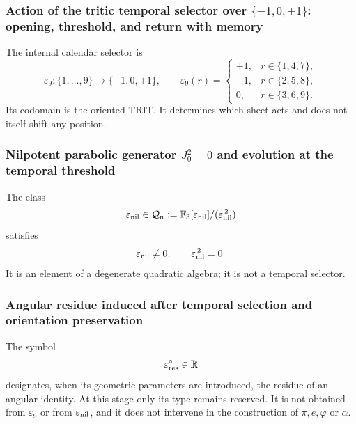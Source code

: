 {\subsubsection{Action of the tritic temporal selector over \(\{-1,0,+1\}\): opening, threshold, and return with memory}

The internal calendar selector is
\begin{equation}
 \varepsilon_9:\{1,\ldots,9\}
 \longrightarrow\{-1,0,+1\},
 \qquad
 \varepsilon_9(r)=
 \begin{cases}
  +1,&r\in\{1,4,7\},\\
  -1,&r\in\{2,5,8\},\\
  0,&r\in\{3,6,9\}.
 \end{cases}
 \label{p12-83-c1-s7:eq:u006e-epsilon-temporal}
\end{equation}
Its codomain is the oriented TRIT. It determines which sheet acts and does not itself shift any position.

\subsubsection{Nilpotent parabolic generator \(J_0^2=0\) and evolution at the temporal threshold}

The class
\begin{equation}
 \varepsilon_{\rm nil}
 \in
 \mathcal Q_{\rm n}:=
 \mathbb F_3[\varepsilon_{\rm nil}]
 /(\varepsilon_{\rm nil}^{\,2})
 \label{p12-83-c1-s7:eq:u006e-epsilon-nilpotente}
\end{equation}
satisfies
\begin{equation}
 \varepsilon_{\rm nil}\neq0,
 \qquad
 \varepsilon_{\rm nil}^{\,2}=0.
 \label{p12-83-c1-s7:eq:u006e-epsilon-nilpotente-relacion}
\end{equation}
It is an element of a degenerate quadratic algebra; it is not a temporal selector.

\subsubsection{Angular residue induced after temporal selection and orientation preservation}

The symbol
\begin{equation}
 \varepsilon_{\rm res}^{\circ}\in\mathbb R
 \label{p12-83-c1-s7:eq:u006e-epsilon-residual-tipo}
\end{equation}
designates, when its geometric parameters are introduced, the residue of an
angular identity. At this stage only its type remains reserved. It is not
obtained from \(\varepsilon_9\) or from
\(\varepsilon_{\rm nil}\), and it does not intervene in the construction of
\(\pi,e,\varphi\) or \(\alpha\).

}
